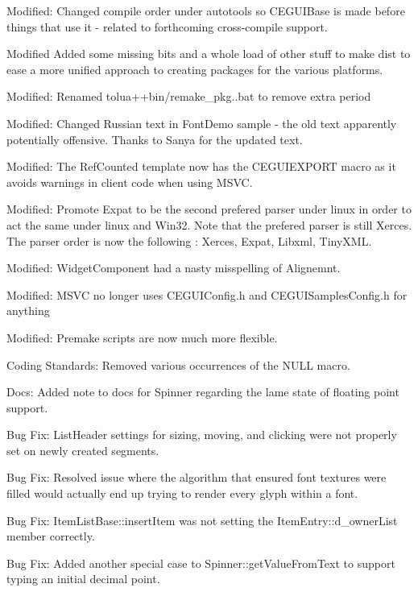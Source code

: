 \begin{DoxyItemize}
\begin{DoxyItemize}
\end{DoxyItemize}
\item Modified\+: Changed compile order under autotools so C\+E\+G\+U\+I\+Base is made before things that use it -\/ related to forthcoming cross-\/compile support.
\item Modified Added some missing bits and a whole load of other stuff to \textquotesingle{}make dist\textquotesingle{} to ease a more unified approach to creating packages for the various platforms.
\item Modified\+: Renamed tolua++bin/remake\+\_\+pkg..bat to remove extra period
\item Modified\+: Changed Russian text in Font\+Demo sample -\/ the old text apparently potentially offensive. Thanks to \textquotesingle{}Sanya\textquotesingle{} for the updated text.
\item Modified\+: The Ref\+Counted template now has the C\+E\+G\+U\+I\+E\+X\+P\+O\+RT macro as it avoids warnings in client code when using M\+S\+VC.
\item Modified\+: Promote Expat to be the second prefered parser under linux in order to act the same under linux and Win32. Note that the prefered parser is still Xerces. The parser order is now the following \+: Xerces, Expat, Libxml, Tiny\+X\+ML.
\item Modified\+: Widget\+Component had a nasty misspelling of \textquotesingle{}Alignemnt\textquotesingle{}.
\item Modified\+: M\+S\+VC no longer uses C\+E\+G\+U\+I\+Config.\+h and C\+E\+G\+U\+I\+Samples\+Config.\+h for anything
\item Modified\+: Premake scripts are now much more flexible.
\item Coding Standards\+: Removed various occurrences of the N\+U\+LL macro.
\item Docs\+: Added note to docs for Spinner regarding the lame state of floating point support.
\item Bug Fix\+: List\+Header settings for sizing, moving, and clicking were not properly set on newly created segments.
\item Bug Fix\+: Resolved issue where the algorithm that ensured font textures were filled would actually end up trying to render every glyph within a font.
\item Bug Fix\+: Item\+List\+Base\+::insert\+Item was not setting the Item\+Entry\+::d\+\_\+owner\+List member correctly.
\item Bug Fix\+: Added another \textquotesingle{}special case\textquotesingle{} to Spinner\+::get\+Value\+From\+Text to support typing an initial decimal point.

\end{DoxyItemize}
